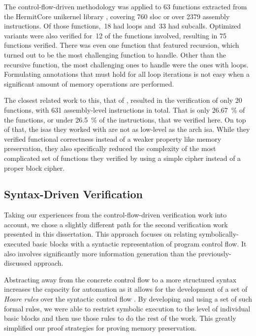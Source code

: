 The control-flow-driven methodology was applied to \num{63} functions
extracted from the HermitCore  \autocite{lankes2016hermitcore}
unikernel library \autocite{madhavapeddy2014unikernels},
covering \num{760} \ac{sloc} or over \num{2379} assembly instructions.
Of those functions,~\num{18} had loops and~\num{33} had subcalls.
Optimized variants were also verified for~\num{12} of the functions involved,
resulting in \num{75} functions verified.
There was even one function that featured recursion,
which turned out to be the most challenging function to handle.
Other than the recursive function, the most challenging ones to handle
were the ones with loops. Formulating annotations that must hold for all loop iterations
is not easy when a significant amount of memory operations are performed.

The closest related work to this, that of \textcite{matthews2006verification},
resulted in the verification of only \num{20} functions,
with \num{631} assembly-level instructions in total.
That is only \SI{26.67}{\percent} of the functions,
or under \SI{26.5}{\percent} of the instructions, that we verified here.
On top of that, the \acp{isa} they worked with are not as low-level as the \gls{arch} \ac{isa}.
While they verified functional correctness
instead of a weaker property like memory preservation,
they also specifically reduced the complexity
of the most complicated set of functions they verified
by using a simple  cipher instead of a proper block cipher.

\subsection{Syntax-Driven Verification}
Taking our experiences from the control-flow-driven verification work into account,
we chose a slightly different path for the second verification work
presented in this dissertation.
This approach focuses on relating symbolically-executed basic blocks
with a syntactic representation of program control flow.
It also involves significantly more information generation
than the previously-discussed approach.

Abstracting away from the concrete control flow to a more structured syntax
increases the capacity for automation
as it allows for the development of a set of \emph{Hoare rules}
over the syntactic control flow \autocite{hoare1969axiomatic}.
By developing and using a set of such formal rules, we were able to restrict symbolic execution
to the level of individual basic blocks and then use those rules to do the rest of the work.
This greatly simplified our proof strategies for proving memory preservation.

